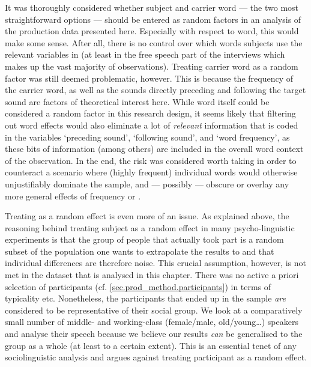 It was thoroughly considered whether subject and carrier word --- the two most straightforward options --- should be entered as random factors in an analysis of the production data presented here.
Especially with respect to word, this would make some sense.
After all, there is no control over which words subjects use the relevant variables in (at least in the free speech part of the interviews which makes up the vast majority of observations).
Treating carrier word as a random factor was still deemed problematic, however.
This is because the frequency of the carrier word, as well as the sounds directly preceding and following the target sound are factors of theoretical interest here.
While word itself could be considered a random factor in this research design, it seems likely that filtering out word effects would also eliminate a lot of \emph{relevant} information that is coded in the variables `preceding sound', `following sound', and `word frequency', as these bits of information (among others) are included in the overall word context of the observation.
In the end, the risk was considered worth taking in order to counteract a scenario where (highly frequent) individual words would otherwise unjustifiably dominate the sample, and --- possibly --- obscure or overlay any more general effects of frequency or .

Treating  as a random effect is even more of an issue.
As explained above, the reasoning behind treating subject as a random effect in many psycho-linguistic experiments is that the group of people that actually took part is a random subset of the population one wants to extrapolate the results to and that individual differences are therefore noise.
This crucial assumption, however, is not met in the dataset that is analysed in this chapter.
There was no active a priori selection of participants (cf. \ref{sec.prod_method.participants}) in terms of typicality etc.
Nonetheless, the participants that ended up in the sample \emph{are} considered to be representative of their social group.
We look at a comparatively small number of middle- and working-class (female/male, old/young\ldots) speakers and analyse their speech because we believe our results \emph{can} be generalised to the group as a whole (at least to a certain extent).
This is an essential tenet of any sociolinguistic analysis and argues against treating participant as a random effect.

